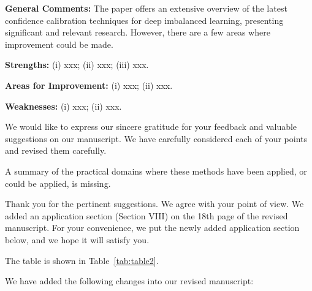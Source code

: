 
\reviewer

\begin{generalcomment}
    \textbf{General Comments:} The paper offers an extensive overview of the latest confidence calibration techniques for deep imbalanced learning, presenting significant and relevant research. However, there are a few areas where improvement could be made.
   
    \textbf{Strengths:} (i) xxx; (ii) xxx; (iii) xxx.

    \textbf{Areas for Improvement:} (i) xxx; (ii) xxx. 
     
    \textbf{Weaknesses:} (i) xxx; (ii) xxx. 

\end{generalcomment}
\begin{revmeta}[]
	We would like to express our sincere gratitude for your feedback and valuable suggestions on our manuscript. We have carefully considered each of your points and revised them carefully.
\end{revmeta}

\begin{revcomment}
A summary of the practical domains where these methods have been applied, or could be applied, is missing.
\end{revcomment}
\begin{revresponse}[]
	Thank you for the pertinent suggestions. We agree with your point of view. We added an application section (Section VIII) on the 18th page of the revised manuscript. For your convenience, we put the newly added application section below, and we hope it will satisfy you.
	
	
	\lipsum[4] \cite{gao2022comparative,zidonghua} The table is shown in Table~\ref{tab:table2}.

    
    \lipsum[5][1-2] 

    We have added the following changes into our revised manuscript:
	\begin{changes}
	
		\lipsum[2][1-2] \cite{silva2023classifier,AnExperimentalInvestigation} 

		
		\newpage
		\modified{\lipsum[3]} 
		
		
	\end{changes}
	
\end{revresponse}


